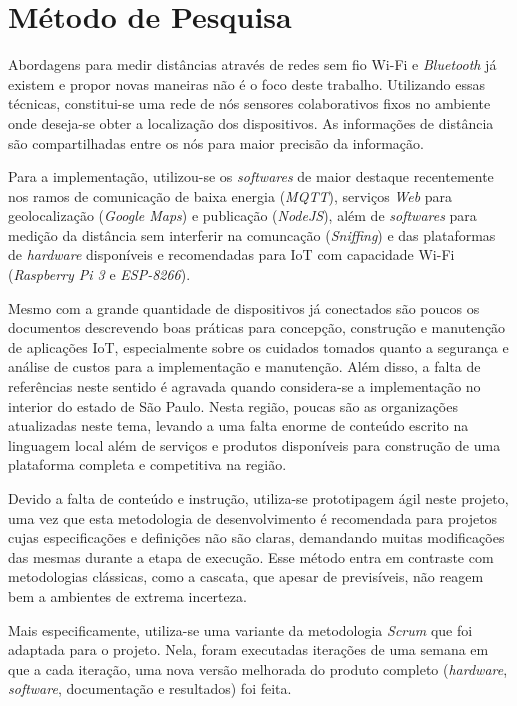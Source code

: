 
\chapter{Método de Pesquisa}
\label{chap:Método de Pesquisa}

Abordagens para medir distâncias através de redes sem fio Wi-Fi
\cite{bahillo2009ieee} e \emph{Bluetooth} já existem e propor novas maneiras
não é o foco deste trabalho. Utilizando essas técnicas, constitui-se uma
rede de nós sensores colaborativos fixos no ambiente onde deseja-se obter a
localização dos dispositivos. As informações de distância são compartilhadas
entre os nós para maior precisão da informação.

Para a implementação, utilizou-se os \emph{softwares} de maior
destaque recentemente nos ramos de comunicação de baixa energia (\emph{MQTT}),
serviços \emph{Web} para geolocalização (\emph{Google Maps}) e publicação
(\emph{NodeJS}), além de \emph{softwares} para medição da distância sem
interferir na comuncação (\emph{Sniffing}) e das plataformas de
\emph{hardware} disponíveis e recomendadas para IoT com capacidade
Wi-Fi (\emph{Raspberry Pi 3} e \emph{ESP-8266}).

Mesmo com a grande quantidade de dispositivos já conectados são poucos os
documentos descrevendo boas práticas para concepção, construção e manutenção de
aplicações IoT, especialmente sobre os cuidados tomados quanto a segurança e
análise de custos para a implementação e manutenção. Além
disso, a falta de referências neste sentido é agravada quando considera-se a
implementação no interior do estado de São Paulo. Nesta região, poucas são as
organizações atualizadas neste tema, levando a uma falta enorme de conteúdo
escrito na linguagem local além de serviços e produtos disponíveis para
construção de uma plataforma completa e competitiva na região.

Devido a falta de conteúdo e instrução, utiliza-se prototipagem ágil neste
projeto, uma vez que esta metodologia de desenvolvimento é recomendada para
projetos cujas especificações e definições não são claras, demandando muitas
modificações das mesmas durante a etapa de execução. Esse método entra em
contraste com metodologias clássicas, como a cascata, que apesar de previsíveis,
não reagem bem a ambientes de extrema incerteza.

Mais especificamente, utiliza-se uma variante da metodologia \emph{Scrum}
\cite{James2016} que foi adaptada para o projeto. Nela, foram executadas
iterações de uma semana em que a cada iteração, uma nova versão melhorada do
produto completo (\emph{hardware}, \emph{software}, documentação e
resultados) foi feita.

